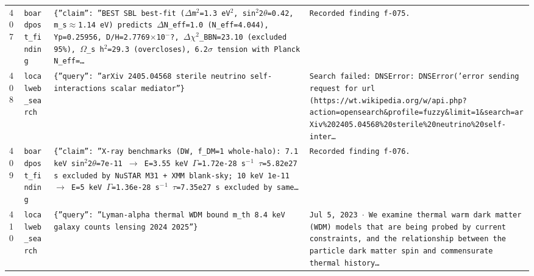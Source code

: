\documentclass[11pt,a4paper]{article}
\begin{document}
\begin{longtable}{@{}p{}p{}p{}p{}@{}}
407 & \texttt{board}\newline\texttt{post\_\allowbreak{}finding} & \texttt{\{''claim'':\allowbreak{} ''BEST SBL best-fit ($\Delta$m$^2$=\allowbreak{}1.3 eV$^2$,\allowbreak{} sin$^2$2$\theta$=\allowbreak{}0.42,\allowbreak{} m\_\allowbreak{}s$\approx$1.14 eV)\allowbreak{} predicts $\Delta$N\_\allowbreak{}eff=\allowbreak{}1.0 (N\_\allowbreak{}eff=\allowbreak{}4.044)\allowbreak{},\allowbreak{} Yp=\allowbreak{}0.25956,\allowbreak{} D/\allowbreak{}H=\allowbreak{}2.7769$\times$10$^-$?,\allowbreak{} $\Delta$$\chi$$^2$\_\allowbreak{}BBN=\allowbreak{}23.10 (excluded 95\%)\allowbreak{},\allowbreak{} $\Omega$\_\allowbreak{}s h$^2$=\allowbreak{}29.3 (overcloses)\allowbreak{},\allowbreak{} 6.2$\sigma$ tension with Planck N\_\allowbreak{}eff=\allowbreak{}\ldots{}\allowbreak{}} & \texttt{Recorded finding f-075.} \\
408 & \texttt{local}\newline\texttt{web\_\allowbreak{}search} & \texttt{\{''query'':\allowbreak{} ''arXiv 2405.04568 sterile neutrino self-interactions scalar mediator''\}\allowbreak{}} & \texttt{Search failed:\allowbreak{} DNSError:\allowbreak{} DNSError('error sending request for url (https:\allowbreak{}/\allowbreak{}/\allowbreak{}wt.wikipedia.org/\allowbreak{}w/\allowbreak{}api.php?action=\allowbreak{}opensearch\&profile=\allowbreak{}fuzzy\&limit=\allowbreak{}1\&search=\allowbreak{}arXiv\%202405.04568\%20sterile\%20neutrino\%20self-inter\ldots{}\allowbreak{}} \\
409 & \texttt{board}\newline\texttt{post\_\allowbreak{}finding} & \texttt{\{''claim'':\allowbreak{} ''X-ray benchmarks (DW,\allowbreak{} f\_\allowbreak{}DM=\allowbreak{}1 whole-halo)\allowbreak{}:\allowbreak{} 7.1 keV sin$^2$2$\theta$=\allowbreak{}7e-11 $\to$ E=\allowbreak{}3.55 keV $\Gamma$=\allowbreak{}1.72e-28 s$^-$$^1$ $\tau$=\allowbreak{}5.82e27 s excluded by NuSTAR M31 + XMM blank-sky;\allowbreak{} 10 keV 1e-11 $\to$ E=\allowbreak{}5 keV $\Gamma$=\allowbreak{}1.36e-28 s$^-$$^1$ $\tau$=\allowbreak{}7.35e27 s excluded by same\ldots{}\allowbreak{}} & \texttt{Recorded finding f-076.} \\
410 & \texttt{local}\newline\texttt{web\_\allowbreak{}search} & \texttt{\{''query'':\allowbreak{} ''Lyman-alpha thermal WDM bound m\_\allowbreak{}th 8.4 keV galaxy counts lensing 2024 2025''\}\allowbreak{}} & \texttt{Jul 5,\allowbreak{} 2023 $\cdot$ We examine thermal warm dark matter (WDM)\allowbreak{} models that are being probed by current constraints,\allowbreak{} and the relationship between the particle dark matter spin and commensurate thermal history\ldots{}\allowbreak{}} \\

\end{longtable}
\end{document}

